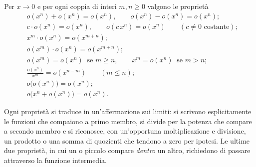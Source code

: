 \begin{proposizione}\label{prop:algebra-o}
Per $x\to0$ e per ogni coppia di interi $m,n\ge0$ valgono le proprietà
\begin{align}
  & o(x^{n})+o(x^{n})=o(x^{n}), \qquad o(x^{n})-o(x^{n})=o(x^{n}); \label{eq:o-somma}\\
  & c\cdot o(x^{n})=o(x^{n}), \qquad o(c\,x^{n})=o(x^{n}) \qquad (c\neq0 \text{ costante}); \label{eq:o-costante}\\
  & x^{m}\cdot o(x^{n})=o(x^{m+n}); \label{eq:o-potenza}\\
  & o(x^{m})\cdot o(x^{n})=o(x^{m+n}); \label{eq:o-prodotto}\\
  & o(x^{m})=o(x^{n}) \ \text{ se } m\ge n, \qquad x^{m}=o(x^{n}) \ \text{ se } m>n; \label{eq:o-ordine}\\
  & \frac{o(x^{n})}{x^{m}}=o(x^{n-m}) \qquad (m\le n); \label{eq:o-quoziente}\\
  & o\bigl(o(x^{n})\bigr)=o(x^{n}); \label{eq:o-o}\\
  & o\bigl(x^{n}+o(x^{n})\bigr)=o(x^{n}). \label{eq:o-somma-interna}
\end{align}
\end{proposizione}

\begin{schema}
\end{schema}

\begin{strategia}
Ogni proprietà si traduce in un'affermazione sui limiti: si scrivono esplicitamente le
funzioni che compaiono a primo membro, si divide per la potenza che compare a secondo
membro e si riconosce, con un'opportuna moltiplicazione e divisione, un prodotto o una
somma di quozienti che tendono a zero per ipotesi. Le ultime due proprietà, in cui un o
piccolo compare \emph{dentro} un altro, richiedono di passare attraverso la funzione
intermedia.
\end{strategia}

